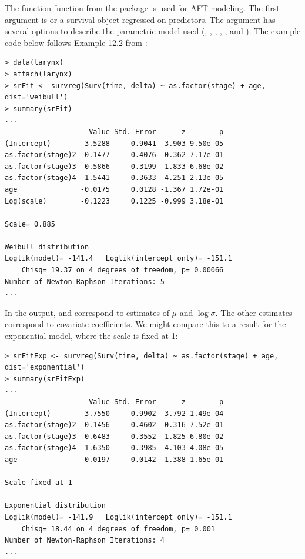 \documentclass[11pt]{article}
\begin{document}
The function  function from the  package is used for AFT modeling. The first argument is  or a survival object regressed on predictors. The argument  has several options to describe the parametric model used (, , , , , and ). The example code below follows Example 12.2 from :
\begin{verbatim}
> data(larynx)
> attach(larynx)
> srFit <- survreg(Surv(time, delta) ~ as.factor(stage) + age, dist='weibull')
> summary(srFit)
...
                    Value Std. Error      z        p
(Intercept)        3.5288     0.9041  3.903 9.50e-05
as.factor(stage)2 -0.1477     0.4076 -0.362 7.17e-01
as.factor(stage)3 -0.5866     0.3199 -1.833 6.68e-02
as.factor(stage)4 -1.5441     0.3633 -4.251 2.13e-05
age               -0.0175     0.0128 -1.367 1.72e-01
Log(scale)        -0.1223     0.1225 -0.999 3.18e-01

Scale= 0.885 

Weibull distribution
Loglik(model)= -141.4   Loglik(intercept only)= -151.1
	Chisq= 19.37 on 4 degrees of freedom, p= 0.00066 
Number of Newton-Raphson Iterations: 5 
...
\end{verbatim}
In the output,  and  correspond to estimates of $\mu$ and $\log\sigma$. The other estimates correspond to covariate coefficients. %
We might compare this to a result for the exponential model, where the scale is fixed at 1:
\begin{verbatim}
> srFitExp <- survreg(Surv(time, delta) ~ as.factor(stage) + age, dist='exponential')
> summary(srFitExp)
...
                    Value Std. Error      z        p
(Intercept)        3.7550     0.9902  3.792 1.49e-04
as.factor(stage)2 -0.1456     0.4602 -0.316 7.52e-01
as.factor(stage)3 -0.6483     0.3552 -1.825 6.80e-02
as.factor(stage)4 -1.6350     0.3985 -4.103 4.08e-05
age               -0.0197     0.0142 -1.388 1.65e-01

Scale fixed at 1 

Exponential distribution
Loglik(model)= -141.9   Loglik(intercept only)= -151.1
	Chisq= 18.44 on 4 degrees of freedom, p= 0.001 
Number of Newton-Raphson Iterations: 4 
...
\end{verbatim}
\end{document}
